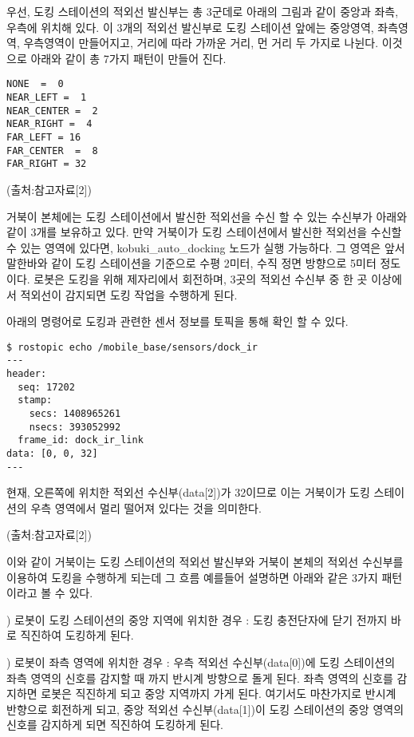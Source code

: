 우선, 도킹 스테이션의 적외선 발신부는 총 3군데로 아래의 그림과 같이 중앙과 좌측, 우측에 위치해 있다. 이 3개의 적외선 발신부로 도킹 스테이션 앞에는 중앙영역, 좌측영역, 우측영역이 만들어지고, 거리에 따라 가까운 거리, 먼 거리 두 가지로 나뉜다. 이것으로 아래와 같이 총 7가지 패턴이 만들어 진다. 

\vspace{\baselineskip}
\begin{lstlisting}[language=ROS]
NONE  =  0
NEAR_LEFT =  1
NEAR_CENTER =  2
NEAR_RIGHT =  4
FAR_LEFT = 16
FAR_CENTER  =  8
FAR_RIGHT = 32
\end{lstlisting}

(출처:참고자료[2])


거북이 본체에는 도킹 스테이션에서 발신한 적외선을 수신 할 수 있는 수신부가 아래와 같이 3개를 보유하고 있다. 만약 거북이가 도킹 스테이션에서 발신한 적외선을 수신할 수 있는 영역에 있다면, kobuki\_auto\_docking 노드가 실행 가능하다. 그 영역은 앞서 말한바와 같이 도킹 스테이션을 기준으로 수평 2미터, 수직 정면 방향으로 5미터 정도이다. 로봇은 도킹을 위해 제자리에서 회전하며, 3곳의 적외선 수신부 중 한 곳 이상에서 적외선이 감지되면 도킹 작업을 수행하게 된다. 

아래의 명령어로 도킹과 관련한 센서 정보를 토픽을 통해 확인 할 수 있다.

\vspace{\baselineskip}
\begin{lstlisting}[language=ROS]
$ rostopic echo /mobile_base/sensors/dock_ir
---
header: 
  seq: 17202
  stamp: 
    secs: 1408965261
    nsecs: 393052992
  frame_id: dock_ir_link
data: [0, 0, 32]
---
\end{lstlisting}


현재, 오른쪽에 위치한 적외선 수신부(data[2])가 32이므로 이는 거북이가 도킹 스테이션의 우측 영역에서 멀리 떨어져 있다는 것을 의미한다.


(출처:참고자료[2])

이와 같이 거북이는 도킹 스테이션의 적외선 발신부와 거북이 본체의 적외선 수신부를 이용하여 도킹을 수행하게 되는데 그 흐름 예를들어 설명하면 아래와 같은 3가지 패턴이라고 볼 수 있다.


\setcounter{num}{0}

\vspace{\baselineskip}
\noindent
{}
\thenum) 로봇이 도킹 스테이션의 중앙 지역에 위치한 경우
:  도킹 충전단자에 닫기 전까지 바로 직진하여 도킹하게 된다.

\vspace{\baselineskip}
\noindent
{}
\thenum) 로봇이 좌측 영역에 위치한 경우
: 우측 적외선 수신부(data[0])에 도킹 스테이션의 좌측 영역의 신호를 감지할 때 까지 반시계 방향으로 돌게 된다. 좌측 영역의 신호를 감지하면 로봇은 직진하게 되고 중앙 지역까지 가게 된다. 여기서도 마찬가지로 반시계 반향으로 회전하게 되고, 중앙 적외선 수신부(data[1])이 도킹 스테이션의 중앙 영역의 신호를 감지하게 되면 직진하여 도킹하게 된다.


